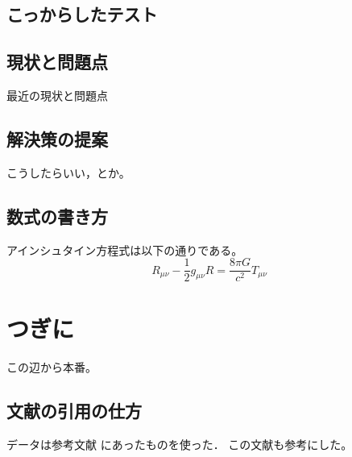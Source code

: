 \documentclass[b5paper,12pt]{jsreport}
\begin{document}
\section{こっからしたテスト}

\section{現状と問題点}

最近の現状と問題点%

\section{解決策の提案}

こうしたらいい，とか。

\section{数式の書き方}

アインシュタイン方程式は以下の通りである。
\begin{equation}
    R_{\mu\nu} - \frac{1}{2} g_{\mu\nu} R = 
    \frac{8\pi G}{c^2} T_{\mu\nu}
\end{equation}



\chapter{つぎに}

この辺から本番。

\section{文献の引用の仕方} 

データは参考文献\cite{rika} にあったものを使った．
この文献\cite{ten}も参考にした。

\end{document}
